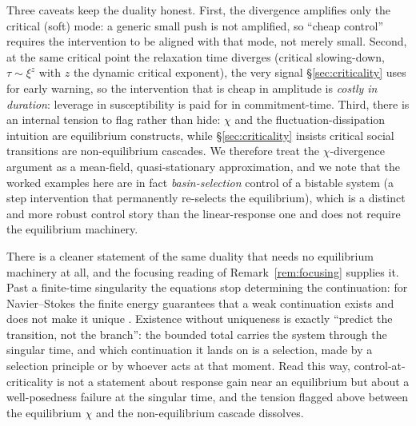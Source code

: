 \documentclass[11pt]{article}
\begin{document}
Three caveats keep the duality honest. First, the divergence amplifies only the critical (soft) mode: a generic small push is not amplified, so ``cheap control'' requires the intervention to be aligned with that mode, not merely small. Second, at the same critical point the relaxation time diverges (critical slowing-down, $\tau \sim \xi^{z}$ with $z$ the dynamic critical exponent), the very signal \S\ref{sec:criticality} uses for early warning, so the intervention that is cheap in amplitude is \emph{costly in duration}: leverage in susceptibility is paid for in commitment-time. Third, there is an internal tension to flag rather than hide: $\chi$ and the fluctuation-dissipation intuition are equilibrium constructs, while \S\ref{sec:criticality} insists critical social transitions are non-equilibrium cascades. We therefore treat the $\chi$-divergence argument as a mean-field, quasi-stationary approximation, and we note that the worked examples here are in fact \emph{basin-selection} control of a bistable system (a step intervention that permanently re-selects the equilibrium), which is a distinct and more robust control story than the linear-response one and does not require the equilibrium machinery.

There is a cleaner statement of the same duality that needs no equilibrium machinery at all, and the focusing reading of Remark~\ref{rem:focusing} supplies it. Past a finite-time singularity the equations stop determining the continuation: for Navier--Stokes the finite energy guarantees that a weak continuation exists \cite{leray1934} and does not make it unique \cite{buckmastervicol2019}. Existence without uniqueness is exactly ``predict the transition, not the branch'': the bounded total carries the system through the singular time, and which continuation it lands on is a selection, made by a selection principle or by whoever acts at that moment. Read this way, control-at-criticality is not a statement about response gain near an equilibrium but about a well-posedness failure at the singular time, and the tension flagged above between the equilibrium $\chi$ and the non-equilibrium cascade dissolves.
\end{document}
